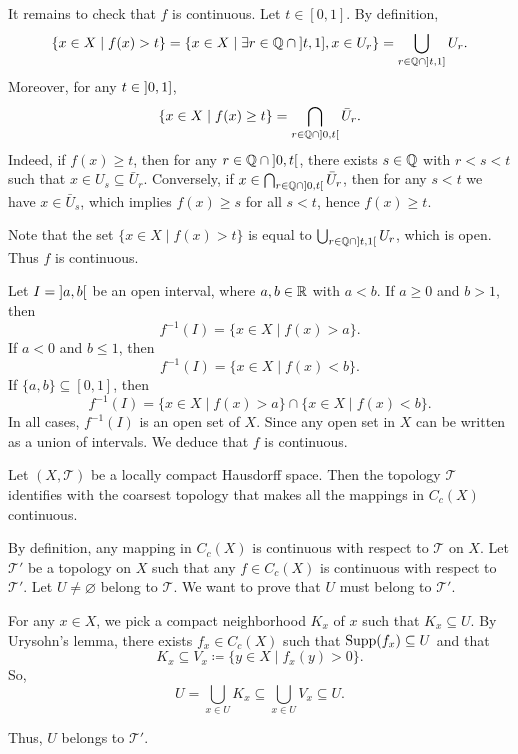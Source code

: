 \begin{proofenv}
    \quad It remains to check that $f$ is continuous.
    Let $t \in [0,1]$.
    By definition,
    $$\{x \in X \mid f(x) > t\} = \{x \in X \mid \exists r \in \QQ \cap \interval[open left] {t}{1}, x \in U_r\} = \bigcup_{r \in \QQ\cap \interval[open left] {t}{1}} U_r.$$
    Moreover, for any $t \in \interval[open left]{0}{1}$,
    $$\{x \in X \mid f(x) \ge t\} = \bigcap_{r \in \QQ\cap\interval[open]{0}{t}} \bar{U}_r.$$
    Indeed, if $f(x) \ge t$, then for any $r \in \QQ \cap \interval[open]{0}{t}$, there exists $s \in \mathbb{Q}$ with $r < s < t$ such that $x \in U_s \subseteq \bar{U}_r$. 
    Conversely, if $x \in \bigcap_{r \in \QQ\cap\interval[open]{0}{t}} \bar{U}_r$, then for any $s < t$ we have $x \in \bar{U}_s$, which implies $f(x) \ge s$ for all $s < t$, hence $f(x) \ge t$.

    \quad Note that the set $\{x \in X \mid f(x) > t\}$ is equal to $\bigcup_{r \in \QQ\cap\interval[open]{t}{1}} U_r$, which is open. 
    Thus $f$ is continuous.


    \quad Let $I = \interval[open]{a}{b}$ be an open interval,
    where $a,b \in \mathbb{R}$ with $a < b$.
    If $a \ge 0$ and $b > 1$,
    then 
    $$f^{-1}(I) = \{x \in X \mid f(x) > a\}.$$
    If $a < 0$ and $b \le 1$, then
    $$f^{-1}(I) = \{x \in X \mid f(x) < b\}.$$
    If $\{a,b\} \subseteq [0,1]$, then
    $$f^{-1}(I) = \{x \in X \mid f(x) > a\} \cap \{x \in X \mid f(x) < b\}.$$
    In all cases, $f^{-1}(I)$ is an open set of $X$.
    Since any open set in $X$ can be written as a union of intervals.
    We deduce that $f$ is continuous.
\end{proofenv}

\begin{corollaryenv}
    Let $(X,\mathscr{T})$ be a locally compact Hausdorff space.
    Then the topology $\mathscr{T}$ identifies with the coarsest topology that makes all the mappings in $C_c(X)$ continuous.
\end{corollaryenv}
\begin{proofenv}
    By definition, any mapping in $C_c(X)$ is continuous with respect to $\mathscr{T}$ on $X$.
    Let $\mathscr{T}'$ be a topology on $X$ such that any $f \in C_c(X)$ is continuous with respect to $\mathscr{T}'$.
    Let $U \neq \varnothing$ belong to $\mathscr{T}$.
    We want to prove that $U$ must belong to $\mathscr{T}'$.
    
    \quad For any $x \in X$, we pick a compact neighborhood $K_x$ of $x$ such that $K_x \subseteq U$.
    By Urysohn's lemma, there exists $f_x \in C_c(X)$ such that $\operatorname{\mathrm{Supp}}(f_x) \subseteq U$ and that
    $$K_x \subseteq V_x \coloneq \{y \in X \mid  f_x(y) > 0\}.$$
    So,
    $$U = \bigcup_{x \in U} K_x \subseteq \bigcup_{x \in U}V_x \subseteq U.$$
    
    \quad Thus, $U$ belongs to $\mathscr{T}'$.
\end{proofenv}

